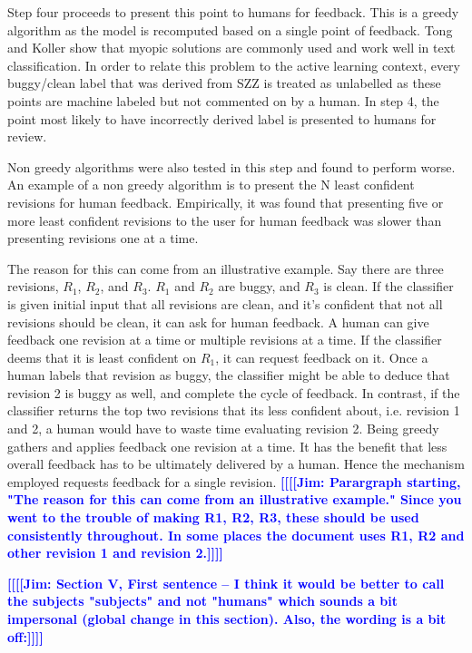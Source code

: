 \documentclass[10pt, conference, letterpaper, compsocconf]{IEEEtran}
\newcommand{\todoc}[2]{{\textcolor{#1} {\textbf{[[#2]]}}}}
\newcommand{\todoblue}[1]{\todoc{blue}{\textbf{[[#1]]}}}
\newcommand{\jim}[1]{\todoblue{Jim: #1}}
\begin{document}
Step four proceeds to present this point to humans for feedback.
This is a greedy algorithm as the model is recomputed based on a single point of feedback.
Tong and Koller \cite{tong2002support} show that myopic solutions are commonly used and work well in text classification.
In order to relate this problem to the active learning context,
every buggy/clean label that was derived from SZZ is treated as unlabelled as these points are machine labeled but not commented on by a human.
In step 4, the point most likely to have incorrectly derived label is presented to humans for review.

Non greedy algorithms were also tested in this step and found to perform worse.
An example of a non greedy algorithm is to present the N least confident revisions for human feedback.
Empirically, it was found that presenting five or more least confident revisions to the user for human feedback
was slower than presenting revisions one at a time.

The reason for this can come from an illustrative example. Say there are three revisions, $R_{1}$, $R_{2}$, and $R_{3}$. $R_{1}$ and $R_{2}$ are buggy, and $R_{3}$ is clean. If the classifier is given initial input that all revisions are clean,
 and it's confident that not all revisions should be clean, it can ask for human feedback. A human can give feedback one revision at a time or multiple revisions at a time. If the classifier deems that it is least confident on $R_{1}$,
  it can request feedback on it. Once a human labels that revision as buggy, the classifier might be able to deduce that revision 2 is buggy as well, and complete the cycle of feedback. In contrast,
  if the classifier returns the top two revisions that its less confident about, i.e. revision 1 and 2, a human would have to waste time evaluating revision 2. Being greedy gathers and applies feedback one revision at a time.
  It has the benefit that less overall feedback has to be ultimately delivered by a human. Hence the mechanism employed requests feedback for a single revision. \jim{Parargraph starting, "The reason for this can come from an illustrative example." Since you went to the trouble of making R1, R2, R3, these should be used consistently throughout. In some places the document uses R1, R2 and other revision 1 and revision 2.}

\jim{Section V, First sentence -- I think it would be better to call the subjects "subjects" and not "humans" which sounds a bit impersonal (global change in this section). Also, the wording is a bit off:}
\end{document}
